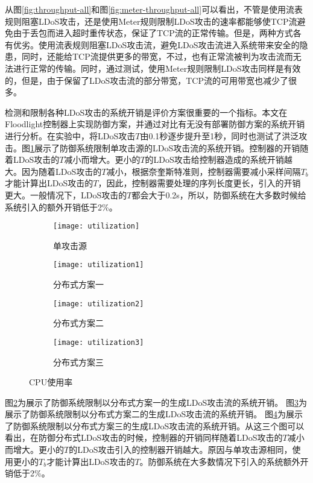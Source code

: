 从图\ref{fig:throughput-all}和图\ref{fig:meter-throughput-all}可以看出，不管是使用流表规则阻塞LDoS攻击，还是使用Meter规则限制LDoS攻击的速率都能够使TCP流避免由于丢包而进入超时重传状态，保证了TCP流的正常传输。但是，两种方式各有优劣。使用流表规则阻塞LDoS攻击流，避免LDoS攻击流进入系统带来安全的隐患，同时，还能给TCP流提供更多的带宽，不过，也有正常流被判为攻击流而无法进行正常的传输。同时，通过测试，使用Meter规则限制LDoS攻击同样是有效的，但是，由于保留了LDoS攻击流的部分带宽，TCP流的可用带宽也减少了很多。

检测和限制各种LDoS攻击的系统开销是评价方案很重要的一个指标。本文在Floodlight控制器上实现防御方案，并通过对比有无没有部署防御方案的系统开销进行分析。在实验中，将LDoS攻击$T$由0.1秒逐步提升至1秒，同时也测试了洪泛攻击。图\ref{fig:CPU-single}展示了防御系统限制单攻击源的LDoS攻击流的系统开销。控制器的开销随着LDoS攻击的$T$减小而增大。更小的$T$的LDoS攻击给控制器造成的系统开销越大。因为随着LDoS攻击的$T$减小，根据奈奎斯特准则，控制器需要减小采样间隔$T_b$才能计算出LDoS攻击的$T$，因此，控制器需要处理的序列长度更长，引入的开销更大。一般情况下，LDoS攻击的$T$都会大于0.2s，所以，防御系统在大多数时候给系统引入的额外开销低于2\%。

\begin{figure}
    \begin{subfigure}{.49\textwidth}
        \centering
        \texttt{[image: utilization]}
        \caption{单攻击源}
        \label{fig:CPU-single}
    \end{subfigure}
    \begin{subfigure}{.49\textwidth}
        \centering
        \texttt{[image: utilization1]}
        \caption{分布式方案一}
        \label{fig:CPU-2h-mod1}
    \end{subfigure}

    \begin{subfigure}{.49\textwidth}
        \centering
        \texttt{[image: utilization2]}
        \caption{分布式方案二}
        \label{fig:CPU-2h-mod2}
    \end{subfigure}
    \begin{subfigure}{.49\textwidth}
        \centering
        \texttt{[image: utilization3]}
        \caption{分布式方案三}
        \label{fig:CPU-2h-mod3}
    \end{subfigure}


    \caption{CPU使用率}
    \label{fig:CPU-all}
\end{figure}

图\ref{fig:CPU-2h-mod1}为展示了防御系统限制以分布式方案一的生成LDoS攻击流的系统开销。
图\ref{fig:CPU-2h-mod2}为展示了防御系统限制以分布式方案二的生成LDoS攻击流的系统开销。
图\ref{fig:CPU-2h-mod3}为展示了防御系统限制以分布式方案三的生成LDoS攻击流的系统开销。从这三个图可以看出，在防御分布式LDoS攻击的时候，控制器的开销同样随着LDoS攻击的$T$减小而增大。更小的$T$的LDoS攻击引入的控制器开销越大。原因与单攻击源相同，使用更小的$T_b$才能计算出LDoS攻击的$T$。防御系统在大多数情况下引入的系统额外开销低于2\%。

